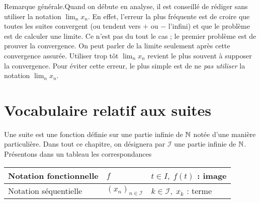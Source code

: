 

Remarque générale.\newline Quand on débute en analyse, il est conseillé de rédiger sans utiliser la notation $\lim _n x_n$. En effet, l'erreur la plus fréquente est de croire que toutes les suites convergent (ou tendent vers $+$ ou $-$ l'infini) et que le problème est de calculer une limite. Ce n'est pas du tout le cas ; le premier problème est de prouver la convergence. On peut parler de la limite seulement après cette convergence assurée. Utiliser trop tôt $\lim _n x_n$ revient le plus souvent à supposer la convergence. Pour éviter cette erreur, le plus simple est de ne \emph{pas utiliser} la notation $\lim _n x_n$.

\section{Vocabulaire relatif aux suites}
Une suite est une fonction définie sur une partie infinie de $\mathbb{N}$ notée d'une manière particulière. Dans tout ce chapitre, on désignera par $\mathcal{I}$ une partie infinie de $\mathbb{N}$.\newline
Présentons dans un tableau les correspondances
\begin{center}
\begin{tabular}{l|l|l}
Notation fonctionnelle & $f$ & $t \in I,\;f(t)$ : image\\ \hline
Notation séquentielle & $(x_n)_{n \in \mathcal{I}}$ & $k\in \mathcal{I},\; x_k$ : terme
\end{tabular}
\end{center}


